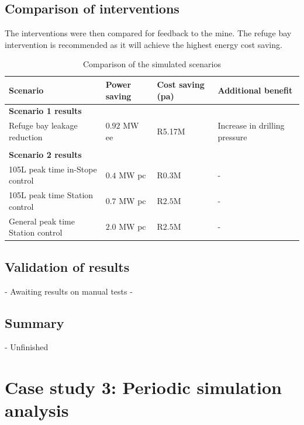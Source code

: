 	\subsection{Comparison of interventions}
	The interventions were then compared for feedback to the mine. The refuge bay intervention is recommended as it will achieve the highest energy cost saving.
	\begin{table}[h]
		\centering
		\begin{tabular}{p{}
				p{}
				p{}
				p{}}
			\hline 
			 \vspace{0.5em}Scenario  &  \vspace{0.5em}Power saving &  Cost saving (\gls{pa}) &  \vspace{0.5em}Additional benefit  \\
			\hline
			\multicolumn{4}{l}{\textbf{Scenario 1 results}} \\
			Refuge bay leakage reduction & $ 0.92 $ MW \gls{ee}  &  R5.17M & Increase in drilling pressure \\
			 \\
			\multicolumn{4}{l}{\textbf{Scenario 2 results}}  \\
			105L peak time in-Stope control & $ 0.4 $ MW \gls{pc} & R$ 0.3 $M& - \\
			105L peak time Station control & $ 0.7 $ MW \gls{pc} & R$ 2.5 $M& - \\
			General peak time Station control & $ 2.0 $ MW \gls{pc} & R$ 2.5 $M& - \\
			\hline 
		\end{tabular}
		\caption{Comparison of the simulated scenarios}
		\label{Table: B Comparison}
	\end{table}

	\subsection{Validation of results}
	
	- Awaiting results on manual tests
	- 
	
	\subsection{Summary}
	- Unfinished
\section{Case study 3: Periodic simulation analysis}
